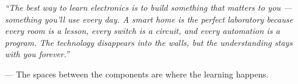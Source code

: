 \documentclass[11pt,letterpaper]{article}
\begin{document}
\vspace{1em}

\begin{quotebox}
\textit{``The best way to learn electronics is to build something that matters to you --- something you'll use every day. A smart home is the perfect laboratory because every room is a lesson, every switch is a circuit, and every automation is a program. The technology disappears into the walls, but the understanding stays with you forever.''}

\vspace{0.5em}
\hfill --- The spaces between the components are where the learning happens.
\end{quotebox}
\end{document}
